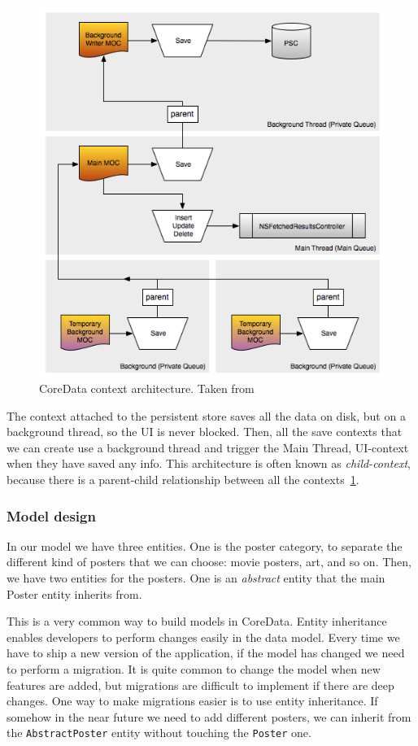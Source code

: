 \begin{figure}
\centering
\includegraphics[scale=0.75]{img/coredataarch.png}
\caption{\label{fig:coredataarch}CoreData context architecture. Taken
  from~\cite{coredataarch}} 
\end{figure} 

The context attached to the persistent store saves all the data on disk, but on a
background thread, so the UI is never blocked. Then, all the save contexts that we
can create use a background thread and trigger the Main Thread, UI-context when they
have saved any info. This architecture is often known as \emph{child-context},
because there is a parent-child relationship between all the
contexts~\ref{fig:coredataarch}. 

\subsubsection{Model design}
In our model we have three entities. One is the poster category, to separate
the different kind of posters that we can choose: movie posters, art, and so
on. Then, we have two entities for the posters. One is an \emph{abstract}
entity that the main Poster entity inherits from. 

This is a very common way to build models in CoreData. Entity inheritance
enables developers to perform changes easily in the data model. Every time we
have to ship a new version of the application, if the model has changed we need
to perform a migration. It is quite common to change the model when new
features are added, but migrations are difficult to implement if there are deep
changes. One way to make migrations easier is to use entity inheritance. If
somehow in the near future we need to add different posters, we can inherit
from the \texttt{AbstractPoster} entity without touching the \texttt{Poster}
one. 

